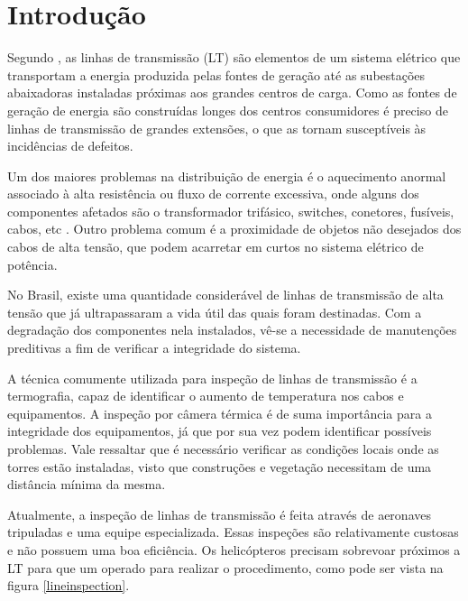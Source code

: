 \chapter{Introdução}
\label{chap:intro}

Segundo , as linhas de transmissão (LT) são elementos de um sistema elétrico que transportam a energia produzida pelas fontes de geração até as subestações abaixadoras instaladas próximas aos grandes centros de carga. Como as fontes de geração
de energia são construídas longes dos centros consumidores é preciso de linhas de transmissão de grandes extensões, o que as tornam susceptíveis às incidências de defeitos.

Um dos maiores problemas na distribuição de energia é o aquecimento anormal associado à alta resistência ou fluxo de corrente excessiva, onde alguns dos componentes afetados são o transformador trifásico, switches, conetores, fusíveis, cabos, etc \cite{canahuire}. Outro problema comum é a proximidade de objetos não desejados dos cabos de alta tensão, que podem acarretar em curtos no sistema elétrico de potência.

No Brasil, existe uma quantidade considerável de linhas de transmissão de alta tensão que já ultrapassaram a vida útil das quais foram destinadas. Com a degradação dos componentes nela instalados, vê-se a necessidade de manutenções preditivas a fim de verificar a integridade do sistema.

A técnica comumente utilizada para inspeção de linhas de transmissão é a termografia, capaz de identificar o aumento de temperatura nos cabos e equipamentos.  A inspeção por câmera térmica é de suma importância para a integridade dos equipamentos, já que por sua vez podem identificar possíveis problemas. Vale ressaltar que é necessário verificar as condições locais onde as torres estão instaladas, visto que construções e vegetação necessitam de uma distância mínima da mesma. 

Atualmente, a inspeção de linhas de transmissão é feita através de aeronaves tripuladas e uma equipe especializada. Essas inspeções são relativamente custosas e não possuem uma boa eficiência. Os helicópteros precisam sobrevoar próximos a LT para que um operado para realizar o procedimento, como pode ser vista na figura \ref{lineinspection}.

\pagebreak


